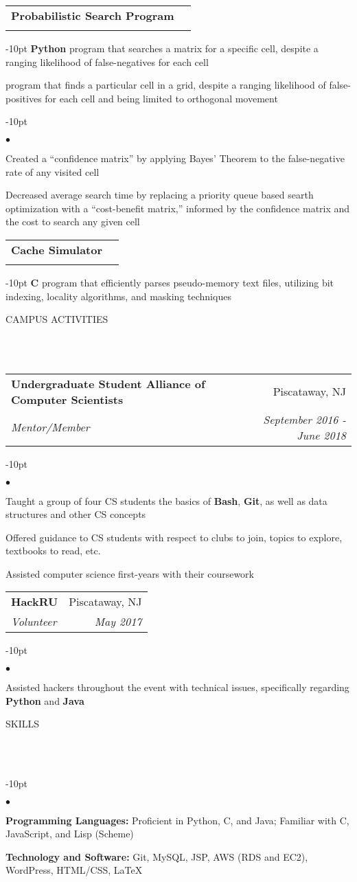 \documentclass[12pt]{article}
\makeatletter
\newcommand{\lineunder}{
	\vspace*{-8pt} \\ 
	\hspace*{-18pt} 
	\hrulefill \\
}
\newcommand{\header}[1]{
	\vspace*{12pt}
	{\hspace*{-14pt}\vspace*{6pt} #1} %
	\vspace*{-6pt} 
	\lineunder
}
\newenvironment{achievements}{
\begin{adjustwidth}{-10pt}{}
  \begin{list}{$\bullet$}{
  	\topsep 0pt \itemsep -4pt}}
  	{\vspace*{2pt}\end{list}
\end{adjustwidth}
}
\def\cpp{
	{\hspace{-0.25em}C\nolinebreak[4]\hspace{-.05em}\raisebox{.4ex}{\tiny		\bf ++}}}
\newcommand{\subheading}[4]{
 	\vspace{5pt}
    	\begin{tabular*}{1.01\textwidth}
    		{l@{\extracolsep{\fill}}r}
      		\hspace{-16pt}\textbf{#1} & #2 \\
      		\hspace{-16pt}\textit{\small#3} & \textit{\small #4} \\
    	\end{tabular*}
    \vspace{-4pt}
}
\makeatother
\begin{document}
\subheading{Probabilistic Search Program}{}{}{}
	\vspace{-15pt}	
	\begin{adjustwidth}{-10pt}{}
	\textbf{Python} program that searches a matrix for a specific cell, despite a ranging likelihood of false-negatives for each cell

	
	program that finds a particular cell in a grid, despite a ranging likelihood of false-positives for each cell and being limited to orthogonal movement
	\end{adjustwidth}
	\begin{achievements}
		\item Created a ``confidence matrix'' by applying Bayes' Theorem to the false-negative rate of any visited cell
		\vspace{4pt}		
		\item Decreased average search time by replacing a priority queue based searth optimization with a ``cost-benefit matrix,'' informed by the confidence matrix and the cost to search any given cell
	\end{achievements}
	
\subheading{Cache Simulator}{}{}{}
	\vspace{-15pt}
	\begin{adjustwidth}{-10pt}{}
	\textbf{C} program that efficiently parses pseudo-memory text files, utilizing bit indexing, locality algorithms, and masking techniques
	\end{adjustwidth}
\vspace*{4pt}


\header{CAMPUS ACTIVITIES}

\subheading
	{Undergraduate Student Alliance of Computer Scientists}{Piscataway, NJ}
	{Mentor/Member}{September 2016 - June 2018}
	\begin{achievements}
		\item Taught a group of four CS students the basics of \textbf{Bash}, \textbf{Git}, as well as data structures and other CS concepts
		\item Offered guidance to CS students with respect to clubs to join, topics to explore, textbooks to read, etc.
		\item Assisted computer science first-years with their coursework
	\end{achievements}
	
\subheading
	{HackRU}{Piscataway, NJ}
	{Volunteer}{May 2017}
	\begin{achievements}
		\item Assisted hackers throughout the event with technical issues, specifically regarding \textbf{Python} and \textbf{Java}
	\end{achievements}

	
\header{SKILLS}
	\begin{achievements}
		\item{\bf Programming Languages:} Proficient in Python, C, and Java; Familiar with \cpp, JavaScript, and Lisp (Scheme)
		\item{\bf Technology and Software:} Git, MySQL, JSP, AWS (RDS and EC2), WordPress, HTML/CSS, \LaTeX
	\end{achievements}
\end{document}
